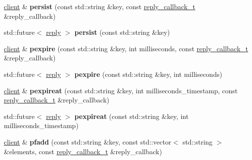 \begin{DoxyCompactItemize}
\hyperlink{classcpp__redis_1_1client}{client} \& {\bfseries persist} (const std\+::string \&key, const \hyperlink{classcpp__redis_1_1client_a061a1140d36d2eaeda82b09a0bb3f9f2}{reply\+\_\+callback\+\_\+t} \&reply\+\_\+callback)
\item 
\mbox{\label{classcpp__redis_1_1client_a9243adf2ff2989cf1cb4de4ce1be1511}} 
std\+::future$<$ \hyperlink{classcpp__redis_1_1reply}{reply} $>$ {\bfseries persist} (const std\+::string \&key)
\item 
\mbox{\label{classcpp__redis_1_1client_a8fc29a500492504985a714d9aaed8963}} 
\hyperlink{classcpp__redis_1_1client}{client} \& {\bfseries pexpire} (const std\+::string \&key, int milliseconds, const \hyperlink{classcpp__redis_1_1client_a061a1140d36d2eaeda82b09a0bb3f9f2}{reply\+\_\+callback\+\_\+t} \&reply\+\_\+callback)
\item 
\mbox{\label{classcpp__redis_1_1client_aa0974d486cae342eced35d64c6e68d40}} 
std\+::future$<$ \hyperlink{classcpp__redis_1_1reply}{reply} $>$ {\bfseries pexpire} (const std\+::string \&key, int milliseconds)
\item 
\mbox{\label{classcpp__redis_1_1client_a7c872e32ed28a78515c1711e4cafbabf}} 
\hyperlink{classcpp__redis_1_1client}{client} \& {\bfseries pexpireat} (const std\+::string \&key, int milliseconds\+\_\+timestamp, const \hyperlink{classcpp__redis_1_1client_a061a1140d36d2eaeda82b09a0bb3f9f2}{reply\+\_\+callback\+\_\+t} \&reply\+\_\+callback)
\item 
\mbox{\label{classcpp__redis_1_1client_af7aeaf2681d57fc30c8535c8d5df1e72}} 
std\+::future$<$ \hyperlink{classcpp__redis_1_1reply}{reply} $>$ {\bfseries pexpireat} (const std\+::string \&key, int milliseconds\+\_\+timestamp)
\item 
\mbox{\label{classcpp__redis_1_1client_ade84308f3ef8bfc75c092388ec538469}} 
\hyperlink{classcpp__redis_1_1client}{client} \& {\bfseries pfadd} (const std\+::string \&key, const std\+::vector$<$ std\+::string $>$ \&elements, const \hyperlink{classcpp__redis_1_1client_a061a1140d36d2eaeda82b09a0bb3f9f2}{reply\+\_\+callback\+\_\+t} \&reply\+\_\+callback)
\item 

\end{DoxyCompactItemize}
